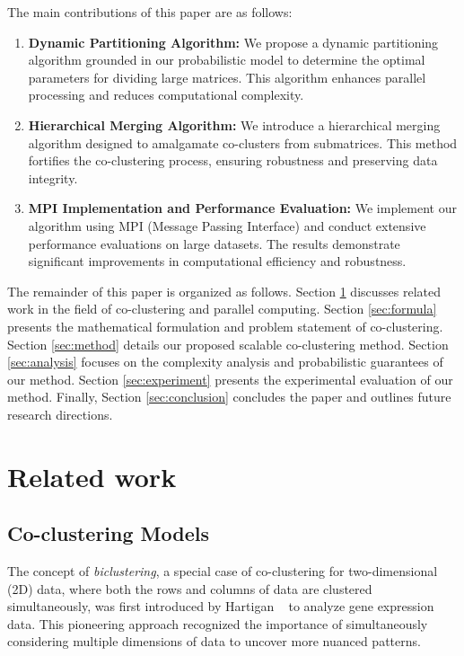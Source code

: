 \documentclass[journal]{IEEEtran}
\renewcommand{\cite}[1]{~\autocite{#1}}
\begin{document}
The main contributions of this paper are as follows:
\begin{enumerate}
  \item \textbf{Dynamic Partitioning Algorithm:}
        We propose a dynamic partitioning algorithm grounded in our probabilistic model to determine the optimal parameters for dividing large matrices. This algorithm enhances parallel processing and reduces computational complexity.

  \item \textbf{Hierarchical Merging Algorithm:}
        We introduce a hierarchical merging algorithm designed to amalgamate co-clusters from submatrices. This method fortifies the co-clustering process, ensuring robustness and preserving data integrity.

  \item \textbf{MPI Implementation and Performance Evaluation:}
        We implement our algorithm using MPI (Message Passing Interface) and conduct extensive performance evaluations on large datasets. The results demonstrate significant improvements in computational efficiency and robustness.

\end{enumerate}

The remainder of this paper is organized as follows. Section \ref{sec:related_work} discusses related work in the field of co-clustering and parallel computing. Section \ref{sec:formula} presents the mathematical formulation and problem statement of co-clustering. Section \ref{sec:method} details our proposed scalable co-clustering method.
Section \ref{sec:analysis} focuses on the complexity analysis and probabilistic guarantees of our method.
Section \ref{sec:experiment} presents the experimental evaluation of our method. Finally, Section \ref{sec:conclusion} concludes the paper and outlines future research directions.

\section{Related work}
\label{sec:related_work}
\subsection{Co-clustering Models}

The concept of \emph{biclustering}, a special case of co-clustering for two-dimensional (2D) data, where both the rows and columns of data are clustered simultaneously, was first introduced by Hartigan \cite{hartigan1972DirectClusteringData} to analyze gene expression data. This pioneering approach recognized the importance of simultaneously considering multiple dimensions of data to uncover more nuanced patterns.
\end{document}
